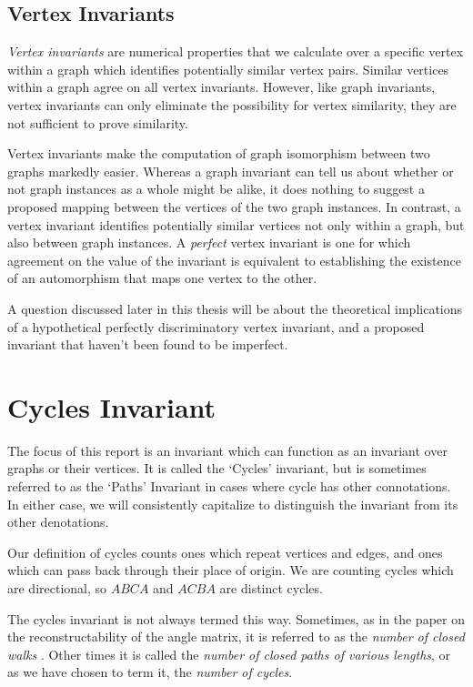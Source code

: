 \subsection{Vertex Invariants}
\emph{Vertex invariants} are numerical properties that we  calculate over a specific vertex within a graph which identifies potentially similar vertex pairs.
Similar vertices within a graph agree on all vertex invariants.
However, like graph invariants, vertex invariants can only eliminate the possibility for vertex similarity, they are not sufficient to prove similarity.

Vertex invariants make the computation of graph isomorphism between two graphs markedly easier. 
Whereas a graph invariant can tell us about whether or not graph instances as a whole might be alike, it does nothing to suggest a proposed mapping between the vertices of the two graph instances.
In contrast, a vertex invariant identifies potentially similar vertices not only within a graph, but also between graph instances.
A \emph{perfect} vertex invariant is one for which agreement on the value of the invariant is equivalent to establishing the existence of an automorphism that maps one vertex to the other.

A question discussed later in this thesis will be about the theoretical implications of a hypothetical perfectly discriminatory vertex invariant, and a proposed invariant that haven't been found to be imperfect.



\section{Cycles Invariant}
The focus of this report is an invariant which can function as an invariant over graphs or their vertices.
It is called the `Cycles' invariant, but is sometimes referred to as the `Paths' Invariant in cases where cycle has other connotations.
In either case, we will consistently capitalize to distinguish the invariant from its other denotations.

Our definition of cycles counts ones which repeat vertices and edges, and ones which can pass back through their place of origin.
We are counting cycles which are directional, so $ABCA$ and $ACBA$ are distinct cycles.

The cycles invariant is not always termed this way.
Sometimes, as in the paper on the reconstructability of the angle matrix, it is referred to as the \emph{number of closed walks} \cite{eigenspaces}.
Other times it is called the \emph{number of closed paths of various lengths}, or as we have chosen to term it, the \emph{number of cycles}.

